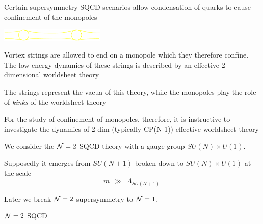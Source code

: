 \documentclass[12pt,letterpaper,landscape,KOMA,smallheadings,calcdimensions,display]{powersem}
\newcommand{\sunu}{SU(N) \times U(1)}
\begin{document}
\begin{slide}

	Certain supersymmetry SQCD scenarios allow condensation of quarks to cause
	confinement of the monopoles

\begin{center}
\textcolor{yellow}{
\includegraphics[width=5.0cm]{str_mon.pdf}
}
\end{center}

	Vortex strings are allowed to end on a monopole which they therefore confine.
	The low-energy dynamics of these strings is described by an effective 2-dimensional
	worldsheet theory

	The strings represent the vacua of this theory, while the monopoles play the role
	of \emph{kinks} of the worldsheet theory

	For the study of confinement of monopoles, therefore, it is instructive to investigate
	the dynamics of 2-dim (typically CP(N-1)) effective worldsheet theory
\end{slide}


\begin{slide}
\vspace*{\fill}
	We consider the $ \mathcal{N}=2 $ SQCD theory with a gauge group $\sunu$.
	
	Supposedly it emerges from $ SU(N+1) $ broken down to $\sunu$ at the scale
\[
	m ~~ \gg ~~ \Lambda_{SU(N+1)}~
\]

	Later we break $ \mathcal{N}=2 $ supersymmetry to $ \mathcal{N}=1 $.
\vspace*{\fill}
\end{slide}


\begin{slide}
\vspace*{3.0cm}
\fontsize{40pt}{40pt}\selectfont
\begin{center} 
	$\mathcal{N}=2$ SQCD 
\end{center}
	
\vspace*{\fill}
\end{slide}
\end{document}
